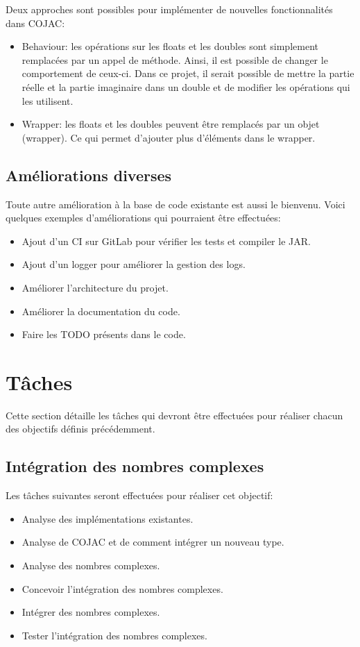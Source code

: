 Deux approches sont possibles pour implémenter de nouvelles fonctionnalités dans COJAC:
\begin{itemize}
    \item Behaviour: les opérations sur les floats et les doubles sont simplement remplacées par un appel de méthode. Ainsi, il est possible de changer le comportement de ceux-ci. Dans ce projet, il serait possible de mettre la partie réelle et la partie imaginaire dans un double et de modifier les opérations qui les utilisent.
    \item Wrapper: les floats et les doubles peuvent être remplacés par un objet (wrapper). Ce qui permet d'ajouter plus d'éléments dans le wrapper.
\end{itemize}

\subsection{Améliorations diverses}

Toute autre amélioration à la base de code existante est aussi le bienvenu. Voici quelques exemples d'améliorations qui pourraient être effectuées:
\begin{itemize}
    \item Ajout d'un CI sur GitLab pour vérifier les tests et compiler le JAR.
    \item Ajout d'un logger pour améliorer la gestion des logs.
    \item Améliorer l'architecture du projet.
    \item Améliorer la documentation du code.
    \item Faire les TODO présents dans le code.
\end{itemize}

\section{Tâches}

Cette section détaille les tâches qui devront être effectuées pour réaliser chacun des objectifs définis précédemment.

\subsection{Intégration des nombres complexes}

Les tâches suivantes seront effectuées pour réaliser cet objectif:
\begin{itemize}
    \item Analyse des implémentations existantes.
    \item Analyse de COJAC et de comment intégrer un nouveau type.
    \item Analyse des nombres complexes.
    \item Concevoir l'intégration des nombres complexes.
    \item Intégrer des nombres complexes.
    \item Tester l'intégration des nombres complexes.
\end{itemize}


